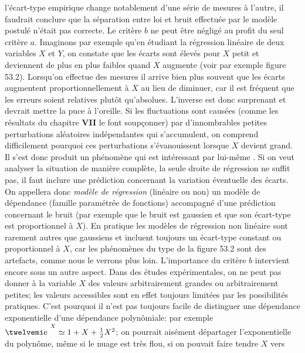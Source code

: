 l'\'ecart-type empirique change notablement d'une s\'erie de mesures 
\`a l'autre, il faudrait conclure que la s\'eparation entre loi et bruit 
effectu\'ee par le mod\`ele postul\'e n'\'etait pas correcte. 
\medskip 
Le crit\`ere $b$ ne peut \^etre n\'eglig\'e au profit du seul crit\`ere
$a$.  Imaginons par exemple qu'en \'etudiant la r\'egression lin\'eaire 
de deux variables $X$ et $Y$, on constate que les \'ecarts sont
\'elev\'es pour $X$ petit et deviennent de plus en plus faibles quand
$X$ augmente (voir par exemple figure 53.2). Lorsqu'on effectue des 
mesures il arrive bien plus souvent que les \'ecarts augmentent 
proportionnellement \`a $X$ au lieu de diminuer, car il est fr\'equent 
que les erreurs soient relatives plut\^ot qu'absolues. L'inverse est 
donc surprenant et devrait mettre la puce \`a l'oreille.  Si les 
fluctuations sont caus\'ees (comme les r\'esultats du chapitre {\bf 
VII} le font soup\c{c}onner) par d'innombrables petites perturbations 
al\'eatoires ind\'ependantes qui s'accumulent, on comprend 
difficilement pourquoi ces perturbations s'\'evanouissent lorsque $X$ 
devient grand. Il s'est donc produit un ph\'enom\`ene qui est 
int\'eressant par lui-m\^eme . Si on veut analyser 
la situation de mani\`ere compl\`ete, la seule droite de r\'egression
ne suffit pas, il faut inclure une pr\'ediction concernant la variation 
\'eventuelle des \'ecarts. On appellera donc {\it mod\`ele de
r\'egression} (lin\'eaire ou non) un mod\`ele de d\'ependance (famille 
param\'etr\'ee de fonctions) accompagn\'e d'une pr\'ediction 
concernant le bruit (par exemple que le bruit est gaussien et que son 
\'ecart-type est proportionnel \`a $X$). En pratique les mod\`eles de 
r\'egression non lin\'eaire sont rarement autres que gaussiens et 
incluent toujours un \'ecart-type constant ou proportionnel \`a $X$, 
car les ph\'enom\`enes du type de la figure 53.2 sont des artefacts, 
comme nous le verrons plus loin. 
\medskip 
L'importance du crit\`ere $b$ intervient encore sous un autre aspect. 
Dans des \'etudes exp\'erimentales, on ne peut pas donner \`a la
variable $X$ des valeurs arbitrairement grandes ou arbitrairement 
petites; les valeurs accessibles sont en effet toujours limit\'ees par 
les possibilit\'es pratiques. C'est pourquoi il n'est pas toujours facile 
de distinguer une d\'ependance exponentielle d'une d\'ependance 
polyn\^omiale: par exemple $\e^X \simeq 1 + X + {1\over 2} X^2$; on 
pourrait ais\'ement d\'epartager l'exponentielle du polyn\^ome, 
m\^eme si le nuage est tr\`es flou, si on pouvait faire tendre $X$ vers 
